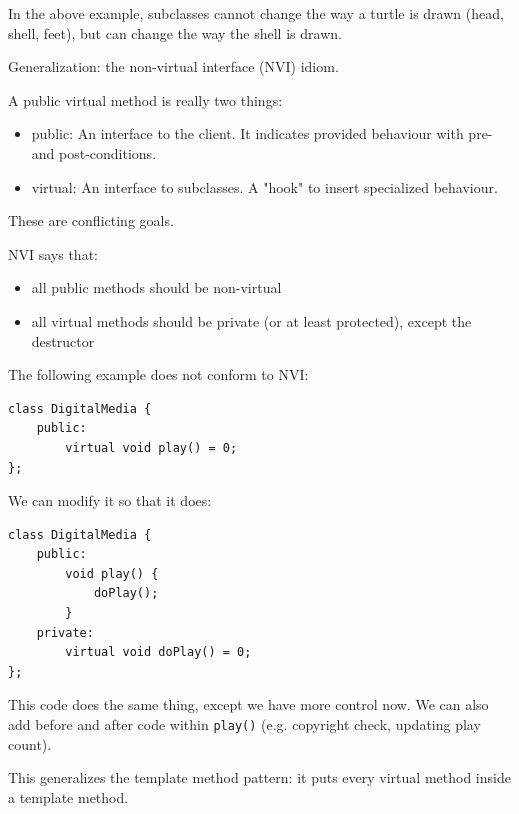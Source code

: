 \documentclass[11pt]{article}
\theoremstyle{definition}
\begin{document}
In the above example, subclasses cannot change the way a turtle is drawn (head, shell, feet), but can change the way the shell is drawn.

Generalization: the non-virtual interface (NVI) idiom.

A public virtual method is really two things:\vspace{-0.25cm}
\begin{itemize}
    \item public: An interface to the client. It indicates provided behaviour with pre- and post-conditions.
    \item virtual: An interface to subclasses. A "hook" to insert specialized behaviour.
\end{itemize}
\vspace{-0.25cm}
These are conflicting goals.

NVI says that:\vspace{-0.25cm}
\begin{itemize}
    \item all public methods should be non-virtual
    \item all virtual methods should be private (or at least protected), except the destructor
\end{itemize}
\vspace{-0.25cm}
The following example does not conform to NVI:
\begin{lstlisting}
class DigitalMedia {
    public:
        virtual void play() = 0;
};
\end{lstlisting}
\vspace{-0.25cm}
We can modify it so that it does:
\begin{lstlisting}
class DigitalMedia {
    public:
        void play() {
            doPlay();
        }
    private:
        virtual void doPlay() = 0;
};
\end{lstlisting}
\vspace{-0.25cm}
This code does the same thing, except we have more control now. We can also add before and after code within {\tt play()} (e.g. copyright check, updating play count).

This generalizes the template method pattern: it puts every virtual method inside a template method.
\end{document}
